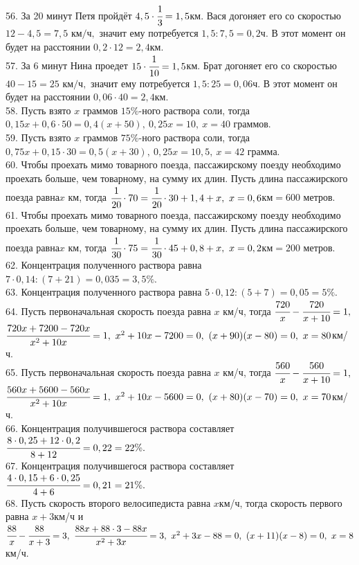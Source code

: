 \documentclass[12pt]{article}
\begin{document}
56. За 20 минут Петя пройдёт $4,5\cdot\cfrac{1}{3}=1,5$км. Вася догоняет его со скоростью $12-4,5=7,5\text{ км/ч},$ значит ему потребуется $1,5:7,5=0,2$ч. В этот момент он будет на расстоянии $0,2\cdot12=2,4$км.\\
57. За 6 минут Нина проедет $15\cdot\cfrac{1}{10}=1,5$км. Брат догоняет его со скоростью $40-15=25\text{ км/ч},$ значит ему потребуется $1,5:25=0,06$ч. В этот момент он будет на расстоянии $0,06\cdot40=2,4$км.\\
58. Пусть взято $x$ граммов $15\%$-ного раствора соли, тогда $0,15x+0,6\cdot50=0,4(x+50),\ 0,25x=10,\ x=40$ граммов.\\
59. Пусть взято $x$ граммов $75\%$-ного раствора соли, тогда $0,75x+0,15\cdot30=0,5(x+30),\ 0,25x=10,5,\ x=42$ грамма.\\
60. Чтобы проехать мимо товарного поезда, пассажирскому поезду необходимо проехать больше, чем товарному, на сумму их длин. Пусть длина пассажирского поезда равна$x$ км, тогда $\cfrac{1}{20}\cdot70=\cfrac{1}{20}\cdot30+1,4+x,\ x=0,6$км$=600$ метров.\\
61. Чтобы проехать мимо товарного поезда, пассажирскому поезду необходимо проехать больше, чем товарному, на сумму их длин. Пусть длина пассажирского поезда равна$x$ км, тогда $\cfrac{1}{30}\cdot75=\cfrac{1}{30}\cdot45+0,8+x,\ x=0,2$км$=200$ метров.\\
62. Концентрация полученного раствора равна $7\cdot0,14:(7+21)=0,035=3,5\%.$\\
63. Концентрация полученного раствора равна $5\cdot0,12:(5+7)=0,05=5\%.$\\
64. Пусть первоначальная скорость поезда равна $x$ км/ч, тогда $\cfrac{720}{x}-\cfrac{720}{x+10}=1,$\\$ \cfrac{720x+7200-720x}{x^2+10x}=1,\ x^2+10x-7200=0,\
(x+90)(x-80)=0,\ x=80$км/ч.\\
65. Пусть первоначальная скорость поезда равна $x$ км/ч, тогда $\cfrac{560}{x}-\cfrac{560}{x+10}=1,$\\$ \cfrac{560x+5600-560x}{x^2+10x}=1,\ x^2+10x-5600=0,\
(x+80)(x-70)=0,\ x=70$км/ч.\\
66. Концентрация получившегося раствора составляет $\cfrac{8\cdot0,25+12\cdot0,2}{8+12}=0,22=22\%.$\\
67. Концентрация получившегося раствора составляет $\cfrac{4\cdot0,15+6\cdot0,25}{4+6}=0,21=21\%.$\\
68. Пусть скорость второго велосипедиста равна $x$км/ч, тогда скорость первого равна $x+3$км/ч и $\cfrac{88}{x}-\cfrac{88}{x+3}=3,\ \cfrac{88x+88\cdot3-88x}{x^2+3x}=3,\ x^2+3x-88=0,\ (x+11)(x-8)=0,\ x=8$км/ч.\\
\end{document}
